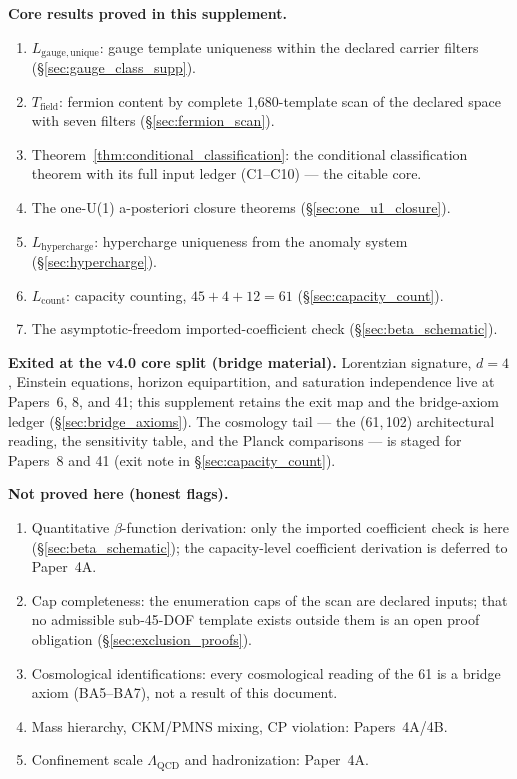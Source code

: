 \documentclass[11pt]{article}
\theoremstyle{definition}
\begin{document}
\begin{tcolorbox}[apfbox, title={What Is Assumed, What Is Proved, What Is Deferred}]
\smallskip\noindent\textbf{Core results proved in this supplement.}
\begin{enumerate}[nosep,label=\arabic*.,leftmargin=2em]
  \item $L_{\mathrm{gauge,unique}}$: gauge template uniqueness within
  the declared carrier filters (\S\ref{sec:gauge_class_supp}).
  \item $T_{\mathrm{field}}$: fermion content by complete
  1{,}680-template scan of the declared space with seven filters
  (\S\ref{sec:fermion_scan}).
  \item Theorem~\ref{thm:conditional_classification}: the conditional
  classification theorem with its full input ledger (C1--C10) --- the
  citable core.
  \item The one-U(1) a-posteriori closure theorems
  (\S\ref{sec:one_u1_closure}).
  \item $L_{\mathrm{hypercharge}}$: hypercharge uniqueness from the
  anomaly system (\S\ref{sec:hypercharge}).
  \item $L_{\mathrm{count}}$: capacity counting, $45+4+12=61$
  (\S\ref{sec:capacity_count}).
  \item The asymptotic-freedom imported-coefficient check
  (\S\ref{sec:beta_schematic}).
\end{enumerate}

\smallskip\noindent\textbf{Exited at the v4.0 core split (bridge
material).}  Lorentzian signature, $d=4$, Einstein equations, horizon
equipartition, and saturation independence live at Papers~6, 8, and 41;
this supplement retains the exit map and the bridge-axiom ledger
(\S\ref{sec:bridge_axioms}).  The cosmology tail --- the (61,\,102)
architectural reading, the sensitivity table, and the Planck
comparisons --- is staged for Papers~8 and 41 (exit note in
\S\ref{sec:capacity_count}).

\smallskip\noindent\textbf{Not proved here (honest flags).}
\begin{enumerate}[nosep,label=\arabic*.,leftmargin=2em]
  \item Quantitative $\beta$-function derivation: only the imported
  coefficient check is here (\S\ref{sec:beta_schematic}); the
  capacity-level coefficient derivation is deferred to Paper~4A.
  \item Cap completeness: the enumeration caps of the scan are
  declared inputs; that no admissible sub-45-DOF template exists
  outside them is an open proof obligation
  (\S\ref{sec:exclusion_proofs}).
  \item Cosmological identifications: every cosmological reading of
  the 61 is a bridge axiom (BA5--BA7), not a result of this document.
  \item Mass hierarchy, CKM/PMNS mixing, CP violation: Papers~4A/4B.
  \item Confinement scale $\Lambda_{\mathrm{QCD}}$ and hadronization:
  Paper~4A.
\end{enumerate}
\end{tcolorbox}
\end{document}
